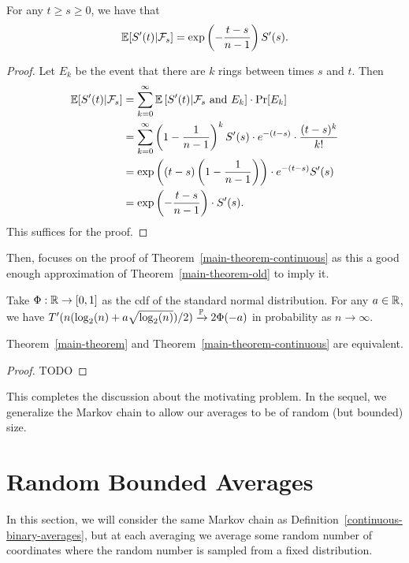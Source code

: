 \documentclass[12pt]{article}
\begin{document}
\begin{prop}
	For any $t \geq s \geq 0$, we have that 
	\[
		\mathbb{E}[S'(t) | \mathcal{F}_s ] = \exp \left ( - \frac{t-s}{n-1} \right ) S'(s).	
	\]
\end{prop}
\begin{proof}
	Let $E_k$ be the event that there are $k$ rings between times $s$ and $t$. Then 
	\begin{align*}
		\mathbb{E} [ S'(t) | \mathcal{F}_s ] & = \sum_{k = 0}^\infty \mathbb{E} \left [ S'(t) | \mathcal{F}_s \text{ and } E_k \right ] \cdot \Pr[E_k] \\
		& = \sum_{k = 0}^\infty \left ( 1 - \frac{1}{n-1} \right )^k S'(s) \cdot e^{-(t-s)} \cdot \frac{(t-s)^k}{k!} \\
		& = \exp \left (  (t-s) \left ( 1 - \frac{1}{n-1} \right ) \right ) \cdot e^{-(t-s)} S'(s) \\
		& = \exp \left ( - \frac{t-s}{n-1} \right ) \cdot S'(s). 
	\end{align*}
	This suffices for the proof. 
\end{proof}

Then, \cite{chatterjee2021phase} focuses on the proof of Theorem~\ref{main-theorem-continuous} as this a good enough approximation of Theorem~\ref{main-theorem-old} to imply it. 

\begin{thm} \label{main-theorem-continuous}
	Take $\Phi : \mathbb{R} \to [0, 1]$ as the cdf of the standard normal distribution. For any $a \in \mathbb{R}$, we have $T'(n (\log_2(n) +a \sqrt{\log_2(n)})/2) \xrightarrow[]{\mathbb{P}} 2 \Phi(-a)$ in probability as $n \to \infty$. 
\end{thm}

\begin{prop}
	Theorem~\ref{main-theorem} and Theorem~\ref{main-theorem-continuous} are equivalent. 
\end{prop}
\begin{proof}
	TODO
\end{proof}

This completes the discussion about the motivating problem. In the sequel, we generalize the Markov chain to allow our averages to be of random (but bounded) size.  

\section{Random Bounded Averages}

In this section, we will consider the same Markov chain as Definition~\ref{continuous-binary-averages}, but at each averaging we average some random number of coordinates where the random number is sampled from a fixed distribution. 
\end{document}
